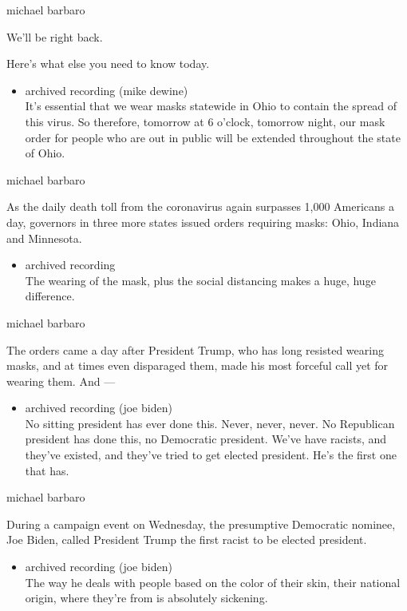 michael barbaro

We'll be right back.

Here's what else you need to know today.

\begin{itemize}
\tightlist
\item
  archived recording (mike dewine)\\
  It's essential that we wear masks statewide in Ohio to contain the
  spread of this virus. So therefore, tomorrow at 6 o'clock, tomorrow
  night, our mask order for people who are out in public will be
  extended throughout the state of Ohio.
\end{itemize}

michael barbaro

As the daily death toll from the coronavirus again surpasses 1,000
Americans a day, governors in three more states issued orders requiring
masks: Ohio, Indiana and Minnesota.

\begin{itemize}
\tightlist
\item
  archived recording\\
  The wearing of the mask, plus the social distancing makes a huge, huge
  difference.
\end{itemize}

michael barbaro

The orders came a day after President Trump, who has long resisted
wearing masks, and at times even disparaged them, made his most forceful
call yet for wearing them. And ---

\begin{itemize}
\tightlist
\item
  archived recording (joe biden)\\
  No sitting president has ever done this. Never, never, never. No
  Republican president has done this, no Democratic president. We've
  have racists, and they've existed, and they've tried to get elected
  president. He's the first one that has.
\end{itemize}

michael barbaro

During a campaign event on Wednesday, the presumptive Democratic
nominee, Joe Biden, called President Trump the first racist to be
elected president.

\begin{itemize}
\tightlist
\item
  archived recording (joe biden)\\
  The way he deals with people based on the color of their skin, their
  national origin, where they're from is absolutely sickening.
\end{itemize}

